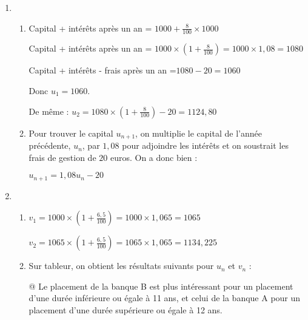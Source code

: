 \begin{corrige}
     \begin{enumerate}
          \item
          \begin{enumerate}[label=\alph*.]
               \item
               Capital + intérêts après un an  = $1000 + \frac{8}{100}\times 1000$
               \par
               Capital + intérêts après un an  = $1000\times \left(1+\frac{8}{100}\right)=1000\times 1,08=1080$
               \par
               Capital + intérêts - frais après un an =$1080-20 = 1060$
               \par
               Donc $u_{1}=1060$.
               \par
               De même : $u_{2}=1080\times \left(1+\frac{8}{100}\right)-20 = 1124,80$
               \item
               Pour trouver le capital $u_{n+1}$, on multiplie le capital de l'année précédente, $u_{n}$, par $1,08$ pour adjoindre les intérêts et on soustrait les frais de gestion de $20$ euros. On a donc bien :
               \par
               $u_{n+1}=1,08u_{n}-20$
          \end{enumerate}
          \item
          \begin{enumerate}[label=\alph*.]
               \item
               $v_{1}=1000\times \left(1+\frac{6,5}{100}\right)=1000\times 1,065=1065$
               \par
               $v_{2}=1065\times \left(1+\frac{6,5}{100}\right)=1065\times 1,065=1134,225$
               \item
               Sur tableur, on obtient les résultats suivants pour $u_{n}$ et $v_{n}$ :

\begin{center}
\end{center}@
               Le placement de la banque B est plus intéressant pour un placement d'une durée inférieure ou égale à 11 ans, et celui de la banque A pour un placement d'une durée supérieure ou égale à 12 ans.
          \end{enumerate}
     \end{enumerate}
\end{corrige}
